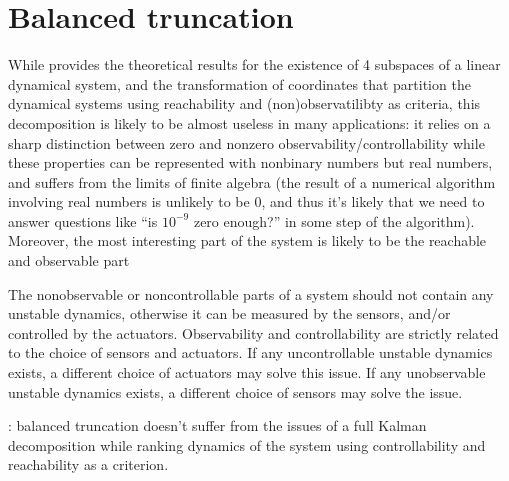 \documentclass[letterpaper,10pt,english]{jupyterBook}
\begin{document}
\section{Balanced truncation}
\label{\detokenize{ch/system-theory/order-reduction-balanced-truncation:balanced-truncation}}\label{\detokenize{ch/system-theory/order-reduction-balanced-truncation:order-reduction-balanced-truncation}}\label{\detokenize{ch/system-theory/order-reduction-balanced-truncation::doc}}
\sphinxAtStartPar
While {\hyperref[\detokenize{ch/system-theory/kalman-decomposition::doc}]{}} provides the theoretical results for the existence of 4 subspaces of a linear dynamical system, and the transformation of coordinates that partition the dynamical systems using reachability and (non\sphinxhyphen{})observatilibty as criteria, this decomposition is likely to be almost useless in many applications: it relies on a sharp distinction between zero and non\sphinxhyphen{}zero observability/controllability while these properties can be represented with non\sphinxhyphen{}binary numbers but real numbers, and suffers from the limits of finite algebra (the result of a numerical algorithm involving real numbers is unlikely to be \(0\), and thus it’s likely that we need to answer questions like “is \(10^{-9}\) zero enough?” in some step of the algorithm). Moreover, the most interesting part of the system is likely to be the reachable and observable part%
\begin{footnote}[1]\sphinxAtStartFootnote
The non\sphinxhyphen{}observable or non\sphinxhyphen{}controllable parts of a system should not contain any unstable dynamics, otherwise it can be measured by the sensors, and/or controlled by the actuators. Observability and controllability are strictly related to the choice of sensors and actuators. If any uncontrollable unstable dynamics exists, a different choice of actuators may solve this issue. If any unobservable unstable dynamics exists, a different choice of sensors may solve the issue.
%
\end{footnote}: balanced truncation doesn’t suffer from the issues of a full Kalman decomposition while ranking dynamics of the system using controllability and reachability as a criterion.
\end{document}
